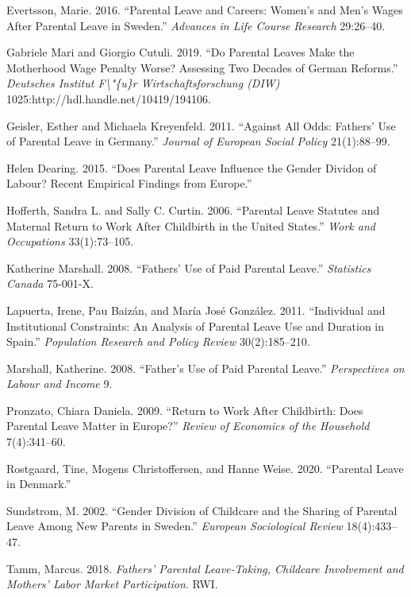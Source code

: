 \documentclass[
  12pt,
]{article}
\begin{document}
\leavevmode\hypertarget{ref-evertsson_parental_2016}{}%
Evertsson, Marie. 2016. ``Parental Leave and Careers: Women's and Men's Wages After Parental Leave in Sweden.'' \emph{Advances in Life Course Research} 29:26--40.

\leavevmode\hypertarget{ref-gabriele_mari_parental_2019}{}%
Gabriele Mari and Giorgio Cutuli. 2019. ``Do Parental Leaves Make the Motherhood Wage Penalty Worse? Assessing Two Decades of German Reforms.'' \emph{Deutsches Institut F\textbackslash"\{u\}r Wirtschaftsforschung (DIW)} 1025:http://hdl.handle.net/10419/194106.

\leavevmode\hypertarget{ref-geisler_against_2011}{}%
Geisler, Esther and Michaela Kreyenfeld. 2011. ``Against All Odds: Fathers' Use of Parental Leave in Germany.'' \emph{Journal of European Social Policy} 21(1):88--99.

\leavevmode\hypertarget{ref-helen_dearing_does_2015}{}%
Helen Dearing. 2015. ``Does Parental Leave Influence the Gender Dividon of Labour? Recent Empirical Findings from Europe.''

\leavevmode\hypertarget{ref-hofferth_parental_2006}{}%
Hofferth, Sandra L. and Sally C. Curtin. 2006. ``Parental Leave Statutes and Maternal Return to Work After Childbirth in the United States.'' \emph{Work and Occupations} 33(1):73--105.

\leavevmode\hypertarget{ref-katherine_marshall_fathers_2008}{}%
Katherine Marshall. 2008. ``Fathers' Use of Paid Parental Leave.'' \emph{Statistics Canada} 75-001-X.

\leavevmode\hypertarget{ref-lapuerta_individual_2011}{}%
Lapuerta, Irene, Pau Baizán, and María José González. 2011. ``Individual and Institutional Constraints: An Analysis of Parental Leave Use and Duration in Spain.'' \emph{Population Research and Policy Review} 30(2):185--210.

\leavevmode\hypertarget{ref-marshall_fathers_2008}{}%
Marshall, Katherine. 2008. ``Father's Use of Paid Parental Leave.'' \emph{Perspectives on Labour and Income} 9.

\leavevmode\hypertarget{ref-pronzato_return_2009}{}%
Pronzato, Chiara Daniela. 2009. ``Return to Work After Childbirth: Does Parental Leave Matter in Europe?'' \emph{Review of Economics of the Household} 7(4):341--60.

\leavevmode\hypertarget{ref-rostgaard_parental_2020}{}%
Rostgaard, Tine, Mogens Christoffersen, and Hanne Weise. 2020. ``Parental Leave in Denmark.''

\leavevmode\hypertarget{ref-sundstrom_gender_2002}{}%
Sundstrom, M. 2002. ``Gender Division of Childcare and the Sharing of Parental Leave Among New Parents in Sweden.'' \emph{European Sociological Review} 18(4):433--47.

\leavevmode\hypertarget{ref-tamm_fathers_2018}{}%
Tamm, Marcus. 2018. \emph{Fathers' Parental Leave-Taking, Childcare Involvement and Mothers' Labor Market Participation}. RWI.
\end{document}

